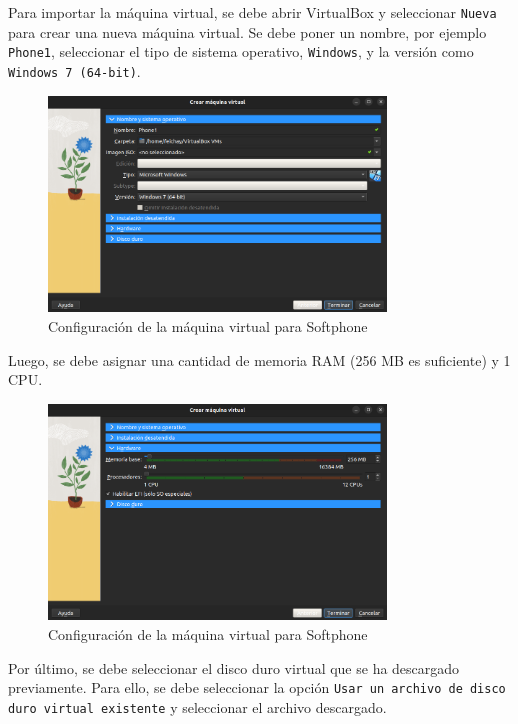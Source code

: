 \vspace{1em}
\noindent
Para importar la máquina virtual, se debe abrir VirtualBox y seleccionar \texttt{Nueva} para crear una nueva máquina virtual. Se debe poner un nombre, por ejemplo \texttt{Phone1}, seleccionar el tipo de sistema operativo, \texttt{Windows}, y la versión como \texttt{Windows 7 (64-bit)}. 

\begin{figure}[H]
	\centering
	\includegraphics[width=0.8\textwidth]{images/softphone_1.png}
	\caption{Configuración de la máquina virtual para Softphone}
	\label{fig:softphone_1}
\end{figure}

\noindent
Luego, se debe asignar una cantidad de memoria RAM (256 MB es suficiente) y 1 CPU.

\begin{figure}[H]
	\centering
	\includegraphics[width=0.8\textwidth]{images/softphone_2.png}
	\caption{Configuración de la máquina virtual para Softphone}
	\label{fig:softphone_2}
\end{figure}

\noindent
Por último, se debe seleccionar el disco duro virtual que se ha descargado previamente. Para ello, se debe seleccionar la opción \texttt{Usar un archivo de disco duro virtual existente} y seleccionar el archivo descargado.

